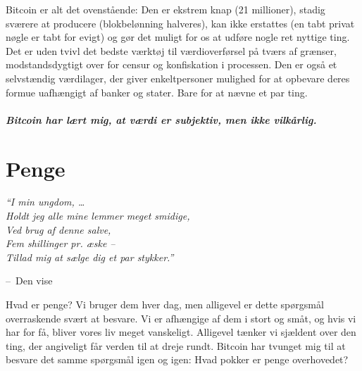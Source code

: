 \documentclass[paper=6in:9in,pagesize=pdftex,headinclude=on,footinclude=on,12pt]{scrbook}
\makeatletter
\newenvironment{chapquote}[2][4em]{\setlength{\@tempdima}{#1}%
   \def\chapquote@author{#2}%
   \parshape 1 \@tempdima \dimexpr\textwidth-2\@tempdima\relax%
   \itshape}{\par\normalfont\hfill--\ \chapquote@author\hspace*{\@tempdima}\par\bigskip}
\makeatother
\begin{document}
Bitcoin er alt det ovenstående: Den er ekstrem knap (21 millioner), stadig sværere at producere (blokbelønning halveres), kan ikke erstattes (en tabt privat nøgle er tabt for evigt) og gør det muligt for os at udføre nogle ret nyttige ting. Det er uden tvivl det bedste værktøj til værdioverførsel på tværs af grænser, modstandsdygtigt over for censur og konfiskation i processen. Den er også et selvstændig værdilager, der giver enkeltpersoner mulighed for at opbevare deres formue uafhængigt af banker og stater. Bare for at nævne et par ting.\paragraph{Bitcoin har lært mig, at værdi er subjektiv, men ikke vilkårlig.}%
%
%
%
%

\chapter{Penge}
\label{les:11}

\begin{chapquote}{Den vise}
\enquote{I min ungdom, \ldots \\ Holdt jeg alle mine lemmer meget smidige, \\ Ved brug af denne salve, \\ Fem shillinger pr. æske -- \\ Tillad mig at sælge dig et par stykker.}
\end{chapquote}

Hvad er penge? Vi bruger dem hver dag, men alligevel er dette spørgsmål overraskende svært at besvare. Vi er afhængige af dem i stort og småt, og hvis vi har for få, bliver vores liv meget vanskeligt. Alligevel tænker vi sjældent over den ting, der angiveligt får verden til at dreje rundt. Bitcoin har tvunget mig til at besvare det samme spørgsmål igen og igen: Hvad pokker er penge overhovedet?
\end{document}
